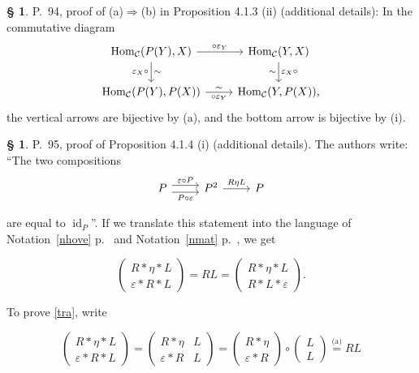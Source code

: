 \documentclass[12pt]{article}
\theoremstyle{remark}
\theoremstyle{definition}
\newtheorem{s}[thm]{\S}
\newcommand{\nn}{\noindent}
\newcommand{\C}{\mathcal C}
\newcommand{\ee}{\varepsilon}
\newcommand{\then}{\Rightarrow}
\DeclareMathOperator{\id}{id}
\DeclareMathOperator{\Hom}{Hom}
\begin{document}
%

\begin{s} 
P.~94, proof of (a)$\then$(b) in Proposition 4.1.3 (ii) (additional details): In the commutative diagram 
$$
\begin{tikzcd}
\Hom_\C(P(Y),X)\ar{d}{\sim}[swap]{\varepsilon_X\circ}\ar{r}{\circ\varepsilon_Y}&\Hom_\C(Y,X)\ar{d}{\varepsilon_X\circ}[swap]{\sim}\\ 
\Hom_\C(P(Y),P(X))\ar{r}[swap]{\circ\varepsilon_Y}{\sim}&\Hom_\C(Y,P(X)),
\end{tikzcd}
$$ 
the vertical arrows are bijective by (a), and the bottom arrow is bijective by (i).
\end{s}


\begin{s} 
P.~95, proof of Proposition 4.1.4 (i) (additional details). The authors write: ``The two compositions 
$$
\begin{tikzcd}
P\ar[yshift=0.7ex]{r}{\ee\circ P}\ar[yshift=-0.7ex]{r}[swap]{P\circ\ee}&P^2\ar{r}{R\eta L}&P
\end{tikzcd}
$$ 

\nn are equal to $\id_P$''. If we translate this statement into the language of Notation~\ref{nhove} p.~\pageref{nhove} and Notation~\ref{nmat} p.~\pageref{nmat}, we get 

\begin{equation}\label{tra}
\begin{pmatrix}R*\eta*L\\ \ee*R*L\end{pmatrix}
=RL=\begin{pmatrix}R*\eta*L\\ R*L*\ee\end{pmatrix}.
\end{equation}

\nn To prove \eqref{tra}, write 

$$
\begin{pmatrix}R*\eta*L\\ \ee*R*L\end{pmatrix}
=\begin{pmatrix}R*\eta&L\\ \ee*R&L\end{pmatrix}
=\begin{pmatrix}R*\eta\\ \ee*R\end{pmatrix}\circ\begin{pmatrix}L\\ L\end{pmatrix}
\overset{\text{(a)}}{=}RL
$$


\end{s}
\end{document}
